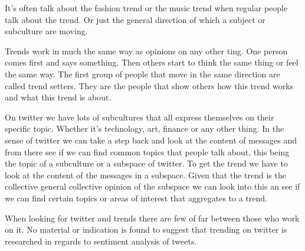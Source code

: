 It's often talk about the fashion trend or the music trend when regular people
talk about the trend. Or just the general direction of which a subject or
subculture are moving. 

Trends work in much the same way as opinions on any other ting. One person
comes first and says something. Then others start to think the same thing or
feel the same way. The first group of people that move in the same direction
are called trend setters. They are the people that show others how this trend works and
what this trend is about. 

On twitter we have lots of subcultures that all express themselves on their
specific topic. Whether it's technology, art, finance or any other thing.  
In the sense of twitter we can take a step back and look at the content of
messages and from there see if we can find common topics that people talk
about, this being the topic of a subculture or a subspace of twitter. To get
the trend we have to look at the content of the messages in a subspace. Given
that the trend is the collective general collective opinion of the subspace we
can look into this an see if we can find certain topics or areas of interest
that aggregates to a trend. 

When looking for twitter and trends there are few of far between those who work
on it. No material or indication is found to suggest that trending on twitter
is researched in regards to sentiment analysis of tweets.


